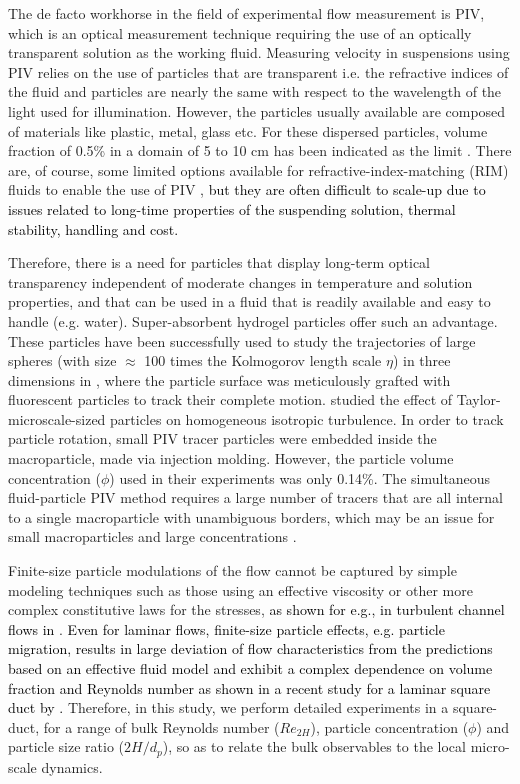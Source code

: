 \documentclass{jfm}
\def\sz#1{{\textcolor{black}{#1}}}
\begin{document}
The de facto workhorse in the field of experimental flow measurement is PIV, which is an optical measurement technique requiring the use of an optically transparent solution as the working fluid. Measuring velocity in suspensions using PIV relies on the use of particles that are transparent i.e. the refractive indices of the fluid and particles are nearly the same with respect to the wavelength of the light used for illumination. However, the particles usually available are composed of materials like plastic, metal, glass etc. For these dispersed particles, volume fraction of 0.5\% in a domain of 5 to 10 cm has been indicated as the limit \citep{poelma2006turbulence}. There are, of course, some limited options available for refractive-index-matching (RIM) fluids to enable the use of PIV \cite[see][]{wiederseiner2011refractive}, \sz{but they are often difficult to scale-up due to issues related to long-time properties of the suspending solution, thermal stability, handling and cost.}

Therefore, there is a need for particles that display long-term optical transparency independent of moderate changes in temperature and solution properties, and that can be used in a fluid that is readily available and easy to handle (e.g. water). Super-absorbent hydrogel particles offer such an advantage. These particles have been successfully used to study the trajectories of large spheres (with size $\approx$ 100 times the Kolmogorov length scale $\eta$) in three dimensions in \cite{klein2012simultaneous}, where the particle surface was meticulously grafted with fluorescent particles to track their complete motion. \citet{bellani2012shape} studied the effect of Taylor-microscale-sized particles on homogeneous isotropic turbulence. In order to track particle rotation, small PIV tracer particles were embedded inside the macroparticle, made via injection molding. However, the particle volume concentration ($\phi$) used in their experiments was only 0.14\%. The simultaneous fluid-particle PIV method requires a large number of tracers that are all internal to a single macroparticle with unambiguous borders, which may be an issue for small macroparticles and large concentrations \citep{byron2013refractive}.

Finite-size particle modulations of the flow cannot be captured by simple modeling techniques such as those using an effective viscosity or other more complex constitutive laws for the stresses, \sz{as shown for e.g., in turbulent channel flows in} \citet{costa2017finite}. \sz{Even for laminar flows, finite-size particle effects, e.g. particle migration, results in large deviation of flow characteristics from the predictions based on an effective fluid model and exhibit a complex dependence on volume fraction and Reynolds number as shown in a recent study for a laminar square duct by \cite{manoorkar2018suspension}.} Therefore, in this study, we perform detailed experiments in a square-duct, for a range of bulk Reynolds number ($Re_{2H}$), particle concentration ($\phi$) and particle size ratio ($2H/d_p$), so as to relate the bulk observables to the local micro-scale dynamics.    
\end{document}
